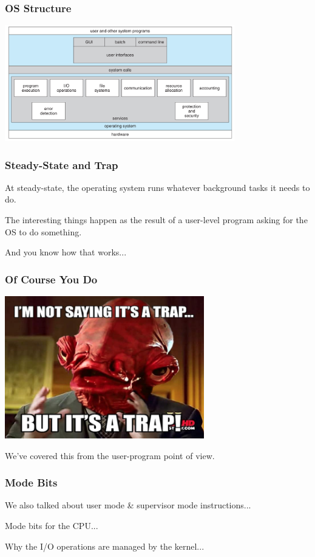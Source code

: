 \begin{frame}
\frametitle{OS Structure}

\begin{center}
	\includegraphics[width=0.75\textwidth]{images/os-structure.png}
\end{center}

\end{frame}

\begin{frame}
\frametitle{Steady-State and Trap}
At steady-state, the operating system runs whatever background tasks it needs to do.

The interesting things happen as the result of a user-level program asking for the OS to do something. 

And you know how that works...

\end{frame}

\begin{frame}
\frametitle{Of Course You Do}

\begin{center}
	\includegraphics[width=0.65\textwidth]{images/trap2.jpg}
\end{center}

We've covered this from the user-program point of view.

\end{frame}

\begin{frame}
\frametitle{Mode Bits}

We also talked about user mode \& supervisor mode instructions...

Mode bits for the CPU...

Why the I/O operations are managed by the kernel...


\end{frame}

